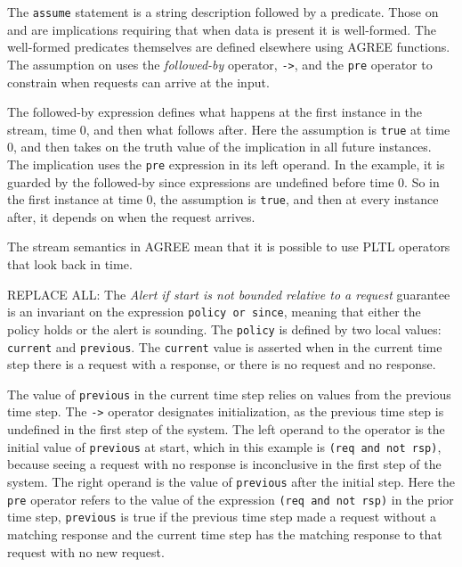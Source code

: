 The \texttt{assume} statement is a string description followed by a predicate.
Those on  and  are implications requiring that when data is present it is well-formed.
The well-formed predicates themselves are defined elsewhere using AGREE functions.
The assumption on  uses the \emph{followed-by} operator, \texttt{->}, and the \texttt{pre} operator to constrain when requests can arrive at the input.


The followed-by expression defines what happens at the first instance in the stream, time 0, and then what follows after. 
Here the assumption is \texttt{true} at time 0, and then takes on the truth value of the implication in all future instances.
The implication uses the \texttt{pre} expression in its left operand. 
In the example, it is guarded by the followed-by since expressions are undefined before time 0.
So in the first instance at time 0, the assumption is \texttt{true}, and then at every instance after, it depends on when the request arrives.

The stream semantics in AGREE mean that it is possible to use PLTL operators that look back in time.

REPLACE ALL: 
The \emph{Alert if start is not bounded relative to a request} guarantee is an invariant on the expression \texttt{policy or since}, meaning that either the policy holds or the alert is sounding.
The \texttt{policy} is defined by two local values: \texttt{current} and \texttt{previous}.
The \texttt{current} value is asserted when in the current time step there is a request with a response, or there is no request and no response.

The value of \texttt{previous} in the current time step relies on values from the previous time step.
The \texttt{->} operator designates initialization, as the previous time step is undefined in the first step of the system.
The left operand to the operator is the initial value of \texttt{previous} at start, which in this example is \texttt{(req and not rsp)}, because seeing a request with no response is inconclusive in the first step of the system.
The right operand is the value of \texttt{previous} after the initial step.
Here the \texttt{pre} operator refers to the value of the expression \texttt{(req and not rsp)} in the prior time step, \texttt{previous} is true if the previous time step made a request without a matching response and the current time step has the matching response to that request with no new request.

